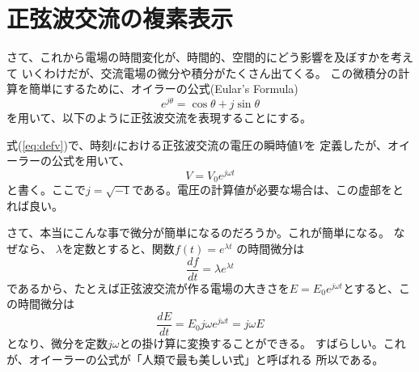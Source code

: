 \section*{正弦波交流の複素表示}
さて、これから電場の時間変化が、時間的、空間的にどう影響を及ぼすかを考えて
いくわけだが、交流電場の微分や積分がたくさん出てくる。
この微積分の計算を簡単にするために、オイラーの公式(Eular's Formula)
\[
e^{j\theta} = \cos\theta + j\sin\theta
\]
を用いて、以下のように正弦波交流を表現することにする。

式(\ref{eq:defv})で、時刻$t$における正弦波交流の電圧の瞬時値$V$を
定義したが、オイーラーの公式を用いて、
\begin{equation}
V = V_0 e^{j\omega t} \label{eq:sinwave}
\end{equation}
と書く。ここで$j=\sqrt{-1}$である。電圧の計算値が必要な場合は、この虚部をとれば良い。

さて、本当にこんな事で微分が簡単になるのだろうか。これが簡単になる。
なぜなら、
$\lambda$を定数とすると、関数$f(t)=e^{\lambda t}$
の時間微分は
\[
\frac{df}{dt}=\lambda e^{\lambda t}
\]
であるから、たとえば正弦波交流が作る電場の大きさを$E=E_0e^{j\omega t}$とすると、この時間微分は
\[
\frac{dE}{dt} = E_0 j\omega e^{j \omega t} = j\omega E
\]
となり、微分を定数$j\omega$との掛け算に変換することができる。
すばらしい。これが、オイーラーの公式が「人類で最も美しい式」と呼ばれる
所以である。

